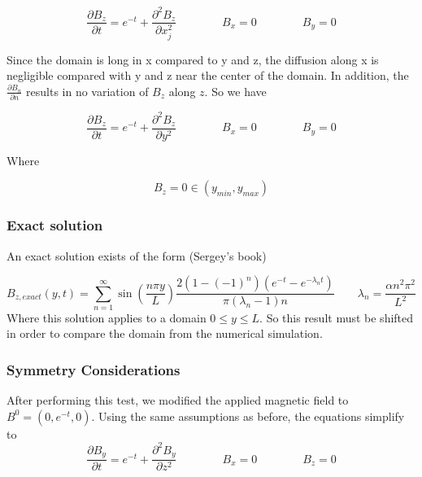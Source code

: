 \documentclass[11pt]{article}
\begin{document}
\begin{equation}
	\frac{\partial B_z}{\partial t} 
	=
	e^{-t}
	+
	\frac{\partial^2 B_z}{\partial x_j^2} 
	\qquad \qquad
	B_x = 0
	\qquad \qquad
	B_y = 0
\end{equation}

Since the domain is long in x compared to y and z, the diffusion along x is negligible compared with y and z near the center of the domain. In addition, the $\frac{\partial B_n}{\partial n}$ results in no variation of $B_z$ along $z$. So we have

\begin{equation}
	\frac{\partial B_z}{\partial t} 
	=
	e^{-t}
	+
	\frac{\partial^2 B_z}{\partial y^2} 
	\qquad \qquad
	B_x = 0
	\qquad \qquad
	B_y = 0
\end{equation}

Where

\begin{equation}
	B_z = 0
	\in (y_{min}, y_{max})
\end{equation}

\subsubsection{Exact solution}

An exact solution exists of the form (Sergey's book)

\begin{equation}
	\boxed{
	B_{z,exact}(y,t) 
	=
	\sum_{n=1}^{\infty}
	\sin \left( \frac{n\pi y}{L} \right)
	\frac{2 (1 - (-1)^n) (e^{-t}-e^{-\lambda_n t})}{\pi (\lambda_n-1)n}
	}
	\qquad
	\boxed{
	\lambda_n = \frac{\alpha n^2\pi^2}{L^2}
	}
\end{equation}
Where this solution applies to a domain $0 \le y \le L$. So this result must be shifted in order to compare the domain from the numerical simulation.

\subsubsection{Symmetry Considerations}

After performing this test, we modified the applied magnetic field to $B^0=(0,e^{-t},0)$. Using the same assumptions as before, the equations simplify to
\begin{equation}
	\frac{\partial B_y}{\partial t} 
	=
	e^{-t}
	+
	\frac{\partial^2 B_y}{\partial z^2} 
	\qquad \qquad
	B_x = 0
	\qquad \qquad
	B_z = 0
\end{equation}
\end{document}
